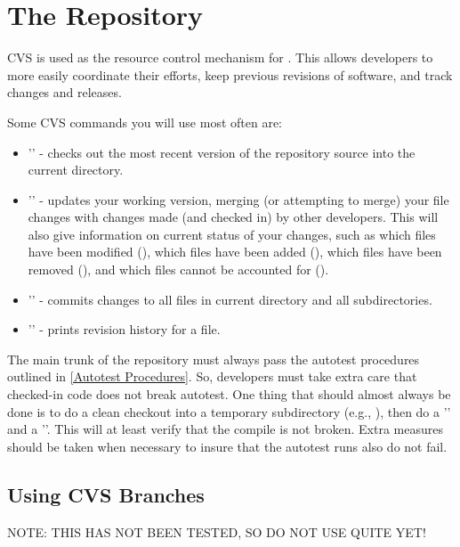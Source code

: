 \chapter{The Repository}
\label{The Repository}

CVS is used as the resource control mechanism for \hypre{}.  This
allows developers to more easily coordinate their efforts, keep
previous revisions of software, and track changes and releases.

Some CVS commands you will use most often are:
\begin{itemize}
\item '' - checks out the most
recent version of the repository source into the current directory.
\item '' - updates your working version, merging
(or attempting to merge) your file changes with changes made (and
checked in) by other developers.  This will also give information on
current status of your changes, such as which files have been modified
(), which files have been added (), which files have
been removed (), and which files cannot be accounted for
().
\item '' - commits changes to all files in current
directory and all subdirectories.
\item '' - prints revision history for a file.
\end{itemize}

The main trunk of the repository must always pass the autotest
procedures outlined in \ref{Autotest Procedures}.  So, developers must
take extra care that checked-in code does not break autotest.  One
thing that should almost always be done is to do a clean checkout into
a temporary subdirectory (e.g., ), then do a
'' and a ''.  This will at least
verify that the compile is not broken.  Extra measures should be taken
when necessary to insure that the autotest runs also do not fail.

\section{Using CVS Branches}
\label{Using CVS Branches}

NOTE: THIS HAS NOT BEEN TESTED, SO DO NOT USE QUITE YET!

